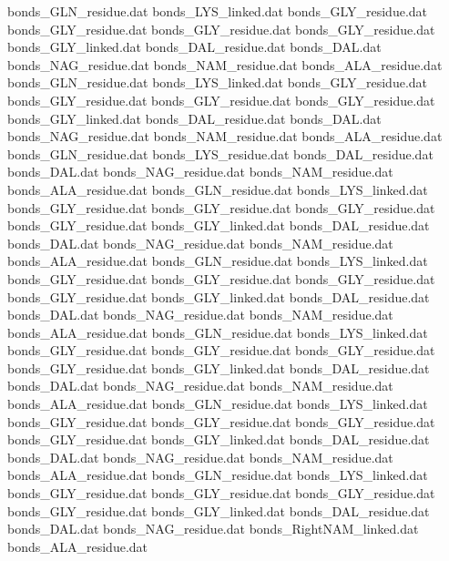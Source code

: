 bonds_GLN_residue.dat           
bonds_LYS_linked.dat            
bonds_GLY_residue.dat
bonds_GLY_residue.dat
bonds_GLY_residue.dat
bonds_GLY_residue.dat
bonds_GLY_linked.dat
bonds_DAL_residue.dat           
bonds_DAL.dat                   
bonds_NAG_residue.dat           
bonds_NAM_residue.dat           
bonds_ALA_residue.dat           
bonds_GLN_residue.dat           
bonds_LYS_linked.dat            
bonds_GLY_residue.dat
bonds_GLY_residue.dat
bonds_GLY_residue.dat
bonds_GLY_residue.dat
bonds_GLY_linked.dat
bonds_DAL_residue.dat           
bonds_DAL.dat                   
bonds_NAG_residue.dat           
bonds_NAM_residue.dat           
bonds_ALA_residue.dat           
bonds_GLN_residue.dat           
bonds_LYS_residue.dat           
bonds_DAL_residue.dat           
bonds_DAL.dat                   
bonds_NAG_residue.dat           
bonds_NAM_residue.dat           
bonds_ALA_residue.dat           
bonds_GLN_residue.dat           
bonds_LYS_linked.dat            
bonds_GLY_residue.dat
bonds_GLY_residue.dat
bonds_GLY_residue.dat
bonds_GLY_residue.dat
bonds_GLY_linked.dat
bonds_DAL_residue.dat           
bonds_DAL.dat                   
bonds_NAG_residue.dat           
bonds_NAM_residue.dat           
bonds_ALA_residue.dat           
bonds_GLN_residue.dat           
bonds_LYS_linked.dat            
bonds_GLY_residue.dat
bonds_GLY_residue.dat
bonds_GLY_residue.dat
bonds_GLY_residue.dat
bonds_GLY_linked.dat
bonds_DAL_residue.dat           
bonds_DAL.dat                   
bonds_NAG_residue.dat           
bonds_NAM_residue.dat           
bonds_ALA_residue.dat           
bonds_GLN_residue.dat           
bonds_LYS_linked.dat            
bonds_GLY_residue.dat
bonds_GLY_residue.dat
bonds_GLY_residue.dat
bonds_GLY_residue.dat
bonds_GLY_linked.dat
bonds_DAL_residue.dat           
bonds_DAL.dat                   
bonds_NAG_residue.dat           
bonds_NAM_residue.dat           
bonds_ALA_residue.dat           
bonds_GLN_residue.dat           
bonds_LYS_linked.dat            
bonds_GLY_residue.dat
bonds_GLY_residue.dat
bonds_GLY_residue.dat
bonds_GLY_residue.dat
bonds_GLY_linked.dat
bonds_DAL_residue.dat           
bonds_DAL.dat                   
bonds_NAG_residue.dat           
bonds_NAM_residue.dat           
bonds_ALA_residue.dat           
bonds_GLN_residue.dat           
bonds_LYS_linked.dat            
bonds_GLY_residue.dat
bonds_GLY_residue.dat
bonds_GLY_residue.dat
bonds_GLY_residue.dat
bonds_GLY_linked.dat
bonds_DAL_residue.dat           
bonds_DAL.dat                   
bonds_NAG_residue.dat           
bonds_RightNAM_linked.dat       
bonds_ALA_residue.dat           
